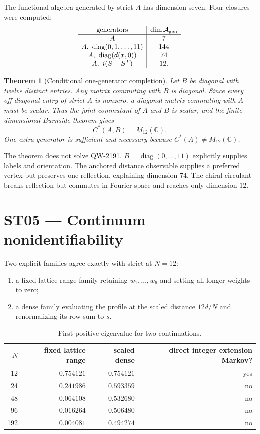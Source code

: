 \documentclass[11pt,a4paper]{article}
\newtheorem{theorem}{Theorem}[section]
\begin{document}
The functional algebra generated by strict $A$ has dimension seven. Four closures were computed:
\[
\begin{array}{c|c}
\text{generators}&\dim\mathcal A_{\rm gen}\\\hline
A&7\\
A,\ \operatorname{diag}(0,1,\ldots,11)&144\\
A,\ \operatorname{diag}(d(x,0))&74\\
A,\ i(S-S^T)&12.
\end{array}
\]

\begin{theorem}[Conditional one-generator completion]
Let $B$ be diagonal with twelve distinct entries. Any matrix commuting with $B$ is diagonal. Since every off-diagonal entry of strict $A$ is nonzero, a diagonal matrix commuting with $A$ must be scalar. Thus the joint commutant of $A$ and $B$ is scalar, and the finite-dimensional Burnside theorem gives
\[
C^*(A,B)=M_{12}(\mathbb C).
\]
One extra generator is sufficient and necessary because $C^*(A)\ne M_{12}(\mathbb C)$.
\end{theorem}

The theorem does not solve QW-2191. $B=\operatorname{diag}(0,\ldots,11)$ explicitly supplies labels and orientation. The anchored distance observable supplies a preferred vertex but preserves one reflection, explaining dimension $74$. The chiral circulant breaks reflection but commutes in Fourier space and reaches only dimension $12$.

\section{ST05 --- Continuum nonidentifiability}

Two explicit families agree exactly with strict at $N=12$:
\begin{enumerate}
\item a fixed lattice-range family retaining $w_1,\ldots,w_6$ and setting all longer weights to zero;
\item a dense family evaluating the profile at the scaled distance $12d/N$ and renormalizing its row sum to $s$.
\end{enumerate}

\begin{table}[H]
\centering
\caption{First positive eigenvalue for two continuations.}
\begin{tabular}{@{}rrrr@{}}
\toprule
$N$ & fixed lattice range & scaled dense & direct integer extension Markov?\\
\midrule
12 & $0.754121$ & $0.754121$ & yes\\
24 & $0.241986$ & $0.593359$ & no\\
48 & $0.064108$ & $0.532680$ & no\\
96 & $0.016264$ & $0.506480$ & no\\
192 & $0.004081$ & $0.494274$ & no\\
\bottomrule
\end{tabular}
\end{table}
\end{document}
